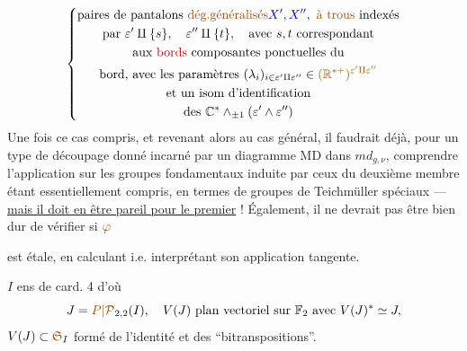 \[
\left\{\begin{gathered}
\text{paires de pantalons }\deleted{\text{\unsure{dég.}}}\inserted{\text{\unsure{généralisés}}}\inserted{X',X''},\ \inserted{\text{\unsure{à trous}}}\ \text{indexés}\\
\text{par }\varepsilon'\amalg\{s\},\quad\varepsilon''\amalg\{t\},\quad\text{avec }s,t\ \text{correspondant}\\
\text{aux }\deleted{\text{bords}}\ \text{composantes ponctuelles du}\\
\text{bord, avec les paramètres }(\lambda_i)_{i\in\varepsilon'\amalg\varepsilon''}\in\unsure{(\mathbb R^{*+})^{\varepsilon'\amalg\varepsilon''}}\\
\text{et un isom d'identification}\\
\text{des }\mathbb C^*\wedge_{\pm1}(\varepsilon'\wedge\varepsilon'')
\end{gathered}\right.
\]
Une fois ce cas compris, et revenant
alors au cas général, il faudrait déjà,
pour un type de découpage donné
incarné par un diagramme MD
dans $md_{g,\nu}$, comprendre l'application
sur les groupes fondamentaux
induite par
ceux du deuxième membre étant
essentiellement compris, en termes de
groupes de Teichmüller spéciaux
--- \uline{mais il doit en être pareil pour le
premier} ! Également, il ne devrait
pas être bien dur de vérifier si $\unsure{\varphi}$

est étale, en calculant i.e. interprétant
son application tangente.


$I$ ens de card. 4 d'où
\[
J=\unsure{P|\mathcal P}_{2,2}(I),\quad V(J)\ \text{plan vectoriel sur }\mathbb F_2\text{ avec }V(J)^*\simeq J,
\]
$V(J)\subset\unsure{\mathfrak S}_I$ formé de l'identité et des ``bitranspositions''.

